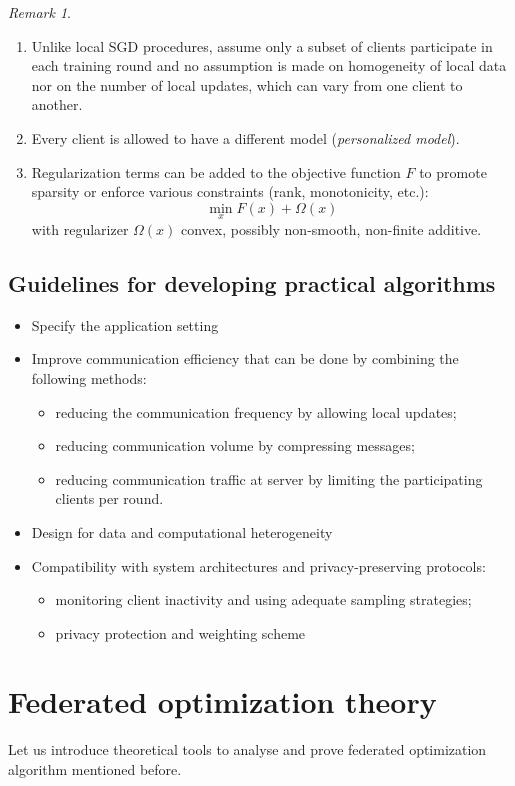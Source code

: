 \documentclass[10pt,a4paper]{book}
\theoremstyle{definition}
\theoremstyle{plain}
\theoremstyle{remark}
\newtheorem{rmk}{Remark}[section]
\begin{document}
\begin{rmk}~
\begin{enumerate}
\item Unlike local SGD procedures,  assume only a subset of clients participate in each training round and no assumption is made on homogeneity of local data nor on the number of local updates, which can vary from one client to another.
\item Every client is allowed to have a different  model (\emph{personalized model}).
\item Regularization terms can be added to the objective function $F$ to promote sparsity or enforce various constraints (rank, monotonicity, etc.):
$$\min_x F(x)+\Omega(x)$$
with regularizer $\Omega(x)$ convex, possibly non-smooth, non-finite additive.
\end{enumerate}
\end{rmk}
\subsection{Guidelines for developing practical algorithms}
\begin{itemize}
\item Specify the application setting
\item Improve communication efficiency that can be done by combining the following methods:
\begin{itemize}
\item reducing the communication frequency by allowing local updates;
\item reducing communication volume by compressing messages;
\item reducing communication traffic at server by limiting the participating clients per round.
\end{itemize}
\item Design for data and computational heterogeneity
\item Compatibility with system architectures and privacy-preserving protocols:
\begin{itemize}
\item monitoring client inactivity and using adequate sampling strategies;
\item privacy protection and weighting scheme
\end{itemize}
\end{itemize}
\section{Federated optimization theory}
Let us introduce theoretical tools to analyse and prove federated optimization algorithm  mentioned before.
\end{document}
